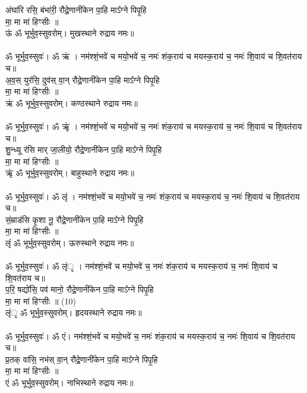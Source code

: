 अंघा॑रि रसि॒ बंभा॑री॒ रौद्रे॒णानी॑केन पा॒हि माऽ᳚ग्ने पिपृ॒हि\\
मा॒ मा मा॑ हिꣳसीः ॥\\
{\small ऊं ॐ भूर्भुव॒स्सुवरोम्। मुखस्थाने रुद्राय नमः॥}\\
\\
{\small ॐ भूर्भुव॒स्सुवः॑। ॐ ऋं । नम॑श्शं॒भवे॑ च मयो॒भवे॑ च॒ नमः॑ शंक॒राय॑ च मयस्क॒राय॑ च॒ नमः॑ शि॒वाय॑ च शि॒वत॑राय च॥}\\
अ॒व॒स् युर॑सि॒ दुव॑स् वा॒न् रौद्रे॒णानी॑केन पा॒हि माऽ᳚ग्ने पिपृ॒हि\\
मा॒ मा मा॑ हिꣳसीः ॥\\
{\small ऋं ॐ भूर्भुव॒स्सुवरोम्। कण्ठस्थाने रुद्राय नमः॥}\\
\\
{\small ॐ भूर्भुव॒स्सुवः॑। ॐ ऋृं । नम॑श्शं॒भवे॑ च मयो॒भवे॑ च॒ नमः॑ शंक॒राय॑ च मयस्क॒राय॑ च॒ नमः॑ शि॒वाय॑ च शि॒वत॑राय च॥}\\
शु॒न्ध्यू र॑सि मार् जा॒लीयो॒ रौद्रे॒णानी॑केन पा॒हि माऽ᳚ग्ने पिपृ॒हि\\
मा॒ मा मा॑ हिꣳसीः ॥\\
{\small ऋृं ॐ भूर्भुव॒स्सुवरोम्। बाहुस्थाने रुद्राय नमः॥}\\
\\
{\small ॐ भूर्भुव॒स्सुवः॑। ॐ लृं । नम॑श्शं॒भवे॑ च मयो॒भवे॑ च॒ नमः॑ शंक॒राय॑ च मयस्क॒राय॑ च॒ नमः॑ शि॒वाय॑ च शि॒वत॑राय च॥}\\
सं॒म्राड॑सि कृ॒शा नू॒ रौद्रे॒णानी॑केन पा॒हि माऽ᳚ग्ने पिपृ॒हि\\
मा॒ मा मा॑ हिꣳसीः ॥\\
{\small लृं  ॐ भूर्भुव॒स्सुवरोम्। ऊरुस्थाने रुद्राय नमः॥}\\
\\
{\small ॐ भूर्भुव॒स्सुवः॑। ॐ लृंृ । नम॑श्शं॒भवे॑ च मयो॒भवे॑ च॒ नमः॑ शंक॒राय॑ च मयस्क॒राय॑ च॒ नमः॑ शि॒वाय॑ च शि॒वत॑राय च॥}\\
प॒रि॒ षद्यो॑सि॒ पव॑ मानो॒ रौद्रे॒णानी॑केन पा॒हि माऽ᳚ग्ने पिपृ॒हि\\
मा॒ मा मा॑ हिꣳसीः ॥ (10)\\
{\small लृंृ  ॐ भूर्भुव॒स्सुवरोम्। हृदयस्थाने रुद्राय नमः॥}\\
\\
{\small ॐ भूर्भुव॒स्सुवः॑। ॐ एं। नम॑श्शं॒भवे॑ च मयो॒भवे॑ च॒ नमः॑ शंक॒राय॑ च मयस्क॒राय॑ च॒ नमः॑ शि॒वाय॑ च शि॒वत॑राय च॥}\\
प्र॒तक् वा॑सि॒ नभ॑स् वा॒न् रौद्रे॒णानी॑केन पा॒हि माऽ᳚ग्ने पिपृ॒हि\\
मा॒ मा मा॑ हिꣳसीः ॥\\
{\small एं ॐ भूर्भुव॒स्सुवरोम्। नाभिस्थाने रुद्राय नमः॥}\\
